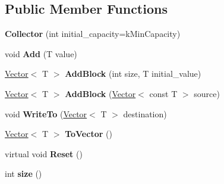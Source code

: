 \subsection*{Public Member Functions}
\begin{DoxyCompactItemize}
\item 
{\bfseries Collector} (int initial\+\_\+capacity=k\+Min\+Capacity)\hypertarget{classv8_1_1internal_1_1_collector_a3838b4dcbb90f36d647f824ad5fa0eb1}{}\label{classv8_1_1internal_1_1_collector_a3838b4dcbb90f36d647f824ad5fa0eb1}

\item 
void {\bfseries Add} (T value)\hypertarget{classv8_1_1internal_1_1_collector_acaac9bfd2e8781d32027df2c9f93e1b5}{}\label{classv8_1_1internal_1_1_collector_acaac9bfd2e8781d32027df2c9f93e1b5}

\item 
\hyperlink{classv8_1_1internal_1_1_vector}{Vector}$<$ T $>$ {\bfseries Add\+Block} (int size, T initial\+\_\+value)\hypertarget{classv8_1_1internal_1_1_collector_a3470f0a3600e437fbdee51a73300b19d}{}\label{classv8_1_1internal_1_1_collector_a3470f0a3600e437fbdee51a73300b19d}

\item 
\hyperlink{classv8_1_1internal_1_1_vector}{Vector}$<$ T $>$ {\bfseries Add\+Block} (\hyperlink{classv8_1_1internal_1_1_vector}{Vector}$<$ const T $>$ source)\hypertarget{classv8_1_1internal_1_1_collector_aa2745d1f45025ce3450802841ad7c353}{}\label{classv8_1_1internal_1_1_collector_aa2745d1f45025ce3450802841ad7c353}

\item 
void {\bfseries Write\+To} (\hyperlink{classv8_1_1internal_1_1_vector}{Vector}$<$ T $>$ destination)\hypertarget{classv8_1_1internal_1_1_collector_a2f49f357b0782e14e3e2435123768322}{}\label{classv8_1_1internal_1_1_collector_a2f49f357b0782e14e3e2435123768322}

\item 
\hyperlink{classv8_1_1internal_1_1_vector}{Vector}$<$ T $>$ {\bfseries To\+Vector} ()\hypertarget{classv8_1_1internal_1_1_collector_ac5d8e65cff7970930aa9d0444057d31f}{}\label{classv8_1_1internal_1_1_collector_ac5d8e65cff7970930aa9d0444057d31f}

\item 
virtual void {\bfseries Reset} ()\hypertarget{classv8_1_1internal_1_1_collector_a9c9394c1dd8e9e139c5dc8a84008078c}{}\label{classv8_1_1internal_1_1_collector_a9c9394c1dd8e9e139c5dc8a84008078c}

\item 
int {\bfseries size} ()\hypertarget{classv8_1_1internal_1_1_collector_a63d78fce1c0b6ee317f13bb07f8fdfcc}{}\label{classv8_1_1internal_1_1_collector_a63d78fce1c0b6ee317f13bb07f8fdfcc}

\end{DoxyCompactItemize}
